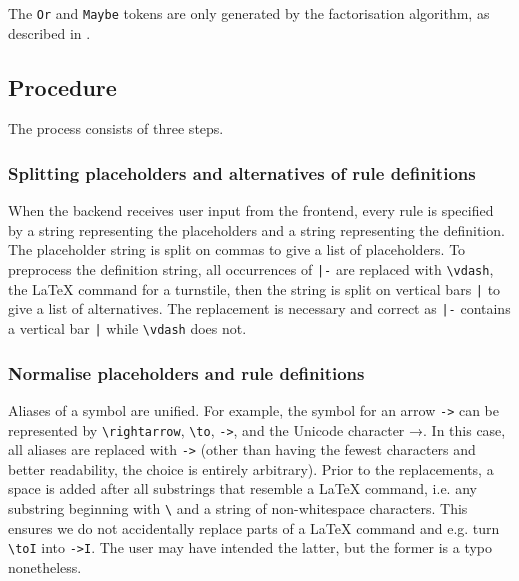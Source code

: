 The \lstinline{Or} and \lstinline{Maybe} tokens are only generated by the factorisation algorithm, as described in .

\subsection{Procedure}
The process consists of three steps.

\subsubsection{Splitting placeholders and alternatives of rule definitions}
When the backend receives user input from the frontend, every rule is specified by a string representing the placeholders and a string representing the definition. The placeholder string is split on commas to give a list of placeholders. To preprocess the definition string, all occurrences of \lstinline{|-} are replaced with \lstinline{\vdash}, the \LaTeX{} command for a turnstile, then the string is split on vertical bars \lstinline{|} to give a list of alternatives. The replacement is necessary and correct as \lstinline{|-} contains a vertical bar \lstinline{|} while \lstinline{\vdash} does not.

\subsubsection{Normalise placeholders and rule definitions}
Aliases of a symbol are unified. For example, the symbol for an arrow \lstinline{->} can be represented by \lstinline{\rightarrow}, \lstinline{\to}, \lstinline{->}, and the Unicode character →. In this case, all aliases are replaced with \lstinline{->} (other than having the fewest characters and better readability, the choice is entirely arbitrary). Prior to the replacements, a space is added after all substrings that resemble a \LaTeX{} command, i.e. any substring beginning with \lstinline{\} and a string of non-whitespace characters. This ensures we do not accidentally replace parts of a \LaTeX{} command and e.g. turn \lstinline{\toI} into \lstinline{->I}. The user may have intended the latter, but the former is a typo nonetheless.

